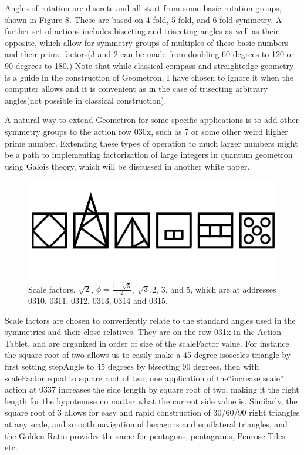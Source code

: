 \documentclass[11pt]{article}
\begin{document}
    Angles of rotation are discrete and all start from some basic rotation groups, shown in Figure 8.  These are based on 4 fold, 5-fold, and 6-fold symmetry.  A further set of actions includes bisecting and trisecting angles as well as their opposite, which allow for symmetry groups of multiples of these basic numbers and their prime factors(3 and 2 can be made from doubling 60 degrees to 120 or 90 degrees to 180.)  Note that while classical compass and straightedge geometry is a guide in the construction of Geometron, I have chosen to ignore it when the computer allows and it is convenient as in the case of trisecting arbitrary angles(not possible in classical construction).      

    A natural way to extend Geometron for some specific applications is to add other symmetry groups to the action row 030x, such as 7 or some other weird higher prime number.  Extending these types of operation to much larger numbers might be a path to implementing factorization of large integers in quantum geometron using Galois theory, which will be discussed in another white paper.


\begin{figure}

\includegraphics[width=\linewidth]{figures/figure9_scales.png}

\caption{Scale factors.  $\sqrt{2}$, $\phi = \frac{1 + \sqrt{5}}{2}$, $\sqrt{3}$,2, 3, and 5, which are at addresses 0310, 0311, 0312, 0313, 0314 and 0315.}
\end{figure}


    Scale factors are chosen to conveniently relate to the standard angles used in the symmetries and their close relatives.  They are on the row 031x in the Action Tablet, and are organized in order of size of the scaleFactor value.  For instance the square root of two allows us to easily make a 45 degree isosceles triangle by first setting stepAngle to 45 degrees by bisecting 90 degrees, then with scaleFactor equal to square root of two, one application of the``increase scale'' action at 0337 increases the side length by square root of two, making it the right length for the hypotenuse no matter what the current side value is.  Similarly, the square root of 3 allows for easy and rapid construction of 30/60/90 right triangles at any scale, and smooth navigation of hexagons and equilateral triangles, and the Golden Ratio provides the same for pentagons, pentagrams, Penrose Tiles etc.  
\end{document}
